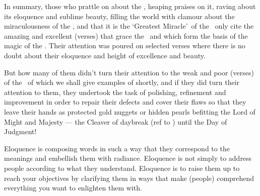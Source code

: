 \documentclass[12pt]{memoir}
\renewcommand\pardivider{\centerline{\ar{۞۞۞}}}
\begin{document}

In summary, those who prattle on about the \Quran, heaping praises on it,
raving about its eloquence and sublime beauty,
filling the world with clamour about the miraculousness of the \Quran,
and that it is the ‘Greatest Miracle’\fnmark\ of the \Quran\
only cite the amazing and excellent (verses) that grace the \Quran\
and which form the basis of the magic of the \Quran.
Their attention was poured on selected verses where there is no doubt
about their eloquence and height of excellence and beauty.


But how many of them didn’t turn their attention to the weak
and poor (verses) of the \Quran\ of which we shall give examples of shortly,
and if they did turn their attention to them,
they undertook the task of polishing, refinement and improvement
in order to repair their defects and cover their flaws
so that they leave their hands as protected gold nuggets
or hidden pearls befitting the Lord of Might and Majesty —
the Cleaver of daybreak (ref to \Quran) until the Day of Judgment!

\pardivider

Eloquence is composing words in such a way that they correspond
to the meanings and embellish them with radiance.
Eloquence is not simply to address people according to what they understand.
Eloquence is to raise them up to reach your objectives
by clarifying them in ways that make (people) comprehend
everything you want to enlighten them with.
\end{document}
